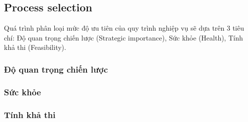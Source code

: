 \subsection{Process selection}
Quá trình phân loại mức độ ưu tiên của quy trình nghiệp vụ sẽ dựa trên 3 tiêu chí: Độ quan trọng chiến lược (Strategic importance), Sức khỏe (Health), Tính khả thi (Feasibility).

\subsubsection{Độ quan trọng chiến lược}
    
\subsubsection{Sức khỏe}
    
\subsubsection{Tính khả thi}
    